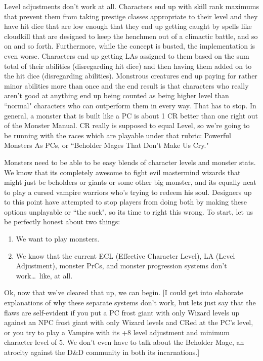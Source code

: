 Level adjustments don't work at all. Characters end up with skill rank maximums that prevent them from taking prestige classes appropriate to their level and they have hit dice that are low enough that they end up getting caught by spells like cloudkill that are designed to keep the henchmen out of a climactic battle, and so on and so forth. Furthermore, while the concept is busted, the implementation is even worse. Characters end up getting LAs assigned to them based on the sum total of their abilities (disregarding hit dice) and then having them added on to the hit dice (disregarding abilities). Monstrous creatures end up paying for rather minor abilities more than once and the end result is that characters who really aren't good at anything end up being counted as being higher level than ``normal" characters who can outperform them in every way. That has to stop. In general, a monster that is built like a PC is about 1 CR better than one right out of the Monster Manual. CR really is supposed to equal Level, so we're going to be running with the races which are playable under that rubric:
Powerful Monsters As PCs, or ``Beholder Mages That Don't Make Us Cry."

Monsters need to be able to be easy blends of character levels and monster stats. We know that its completely awesome to fight evil mastermind wizards that might just be beholders or giants or some other big monster, and its equally neat to play a cursed vampire warriors who's trying to redeem his soul. Designers up to this point have attempted to stop players from doing both by making these options unplayable or ``the suck", so its time to right this wrong. To start, let us be perfectly honest about two things:

\begin{enumerate}\itemspace
   \item We want to play monsters.
   \item We know that the current ECL (Effective Character Level), LA (Level Adjustment), monster PrCs, and monster progression systems don't work\ldots\  like, at all.
\end{enumerate}

Ok, now that we've cleared that up, we can begin. [I could get into elaborate explanations of why these separate systems don't work, but lets just say that the flaws are self-evident if you put a PC frost giant with only Wizard levels up against an NPC frost giant with only Wizard levels and CRed at the PC's level, or you try to play a Vampire with its +8 level adjustment and minimum character level of 5. We don't even have to talk about the Beholder Mage, an atrocity against the D\&D community in both its incarnations.]

